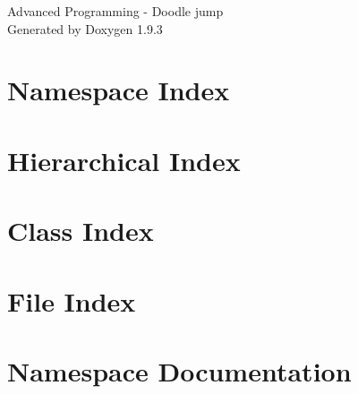 \documentclass[twoside]{book}
\newcommand{\+}{\discretionary{\mbox{\scriptsize$\hookleftarrow$}}{}{}}
\newcommand{\clearemptydoublepage}{%
    \newpage{\pagestyle{empty}\cleardoublepage}%
  }
\begin{document}
  \raggedbottom
    \hypersetup{pageanchor=false,
                bookmarksnumbered=true,
                pdfencoding=unicode
               }
  \begin{titlepage}
  \vspace*{7cm}
  \begin{center}%
  {\Large Advanced Programming -\/ Doodle jump}\\
  \vspace*{1cm}
  {\large Generated by Doxygen 1.9.3}\\
  \end{center}
  \end{titlepage}
  \clearemptydoublepage
  \tableofcontents
  \clearemptydoublepage
  \hypersetup{pageanchor=true}
\chapter{Namespace Index}

\chapter{Hierarchical Index}

\chapter{Class Index}

\chapter{File Index}

\chapter{Namespace Documentation}





\end{document}
